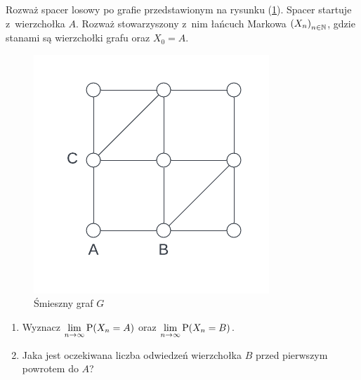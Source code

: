 \begin{exercise}
    Rozważ spacer losowy po grafie przedstawionym na rysunku (\ref{random_walks:a_b_graph}). Spacer startuje z~wierzchołka \(A\). Rozważ stowarzyszony z~nim łańcuch Markowa \(\left(X_n\right)_{n \in \mathbb{N}}\), gdzie stanami są wierzchołki grafu oraz \(X_0 = A\).
    \begin{figure}[H]
        \centering
        \includegraphics{img/markov-chains/a-b-graph.png}
        \caption{Śmieszny graf \(G\)}
        \label{random_walks:a_b_graph}
    \end{figure}
    \begin{enumerate}[label=(\roman*)]
        \item Wyznacz \(\lim\limits_{n \to \infty} \prob\pars{X_n = A}\) oraz \(\lim\limits_{n \to \infty} \prob\pars{X_n = B}\).
        \item Jaka jest oczekiwana liczba odwiedzeń wierzchołka \(B\) przed pierwszym powrotem do \(A\)?
    \end{enumerate}
\end{exercise}

